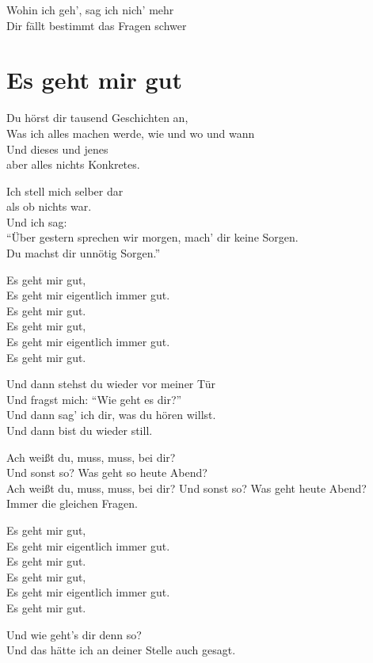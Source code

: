 \documentclass[]{book}
\begin{document}
Wohin ich geh', sag ich nich' mehr\\
Dir fällt bestimmt das Fragen schwer

\hypertarget{es-geht-mir-gut-2}{%
\section{Es geht mir gut}\label{es-geht-mir-gut-2}}

Du hörst dir tausend Geschichten an,\\
Was ich alles machen werde, wie und wo und wann\\
Und dieses und jenes\\
aber alles nichts Konkretes.

Ich stell mich selber dar\\
als ob nichts war.\\
Und ich sag:\\
``Über gestern sprechen wir morgen, mach' dir keine Sorgen.\\
Du machst dir unnötig Sorgen.''

Es geht mir gut,\\
Es geht mir eigentlich immer gut.\\
Es geht mir gut.\\
Es geht mir gut,\\
Es geht mir eigentlich immer gut.\\
Es geht mir gut.

Und dann stehst du wieder vor meiner Tür\\
Und fragst mich: ``Wie geht es dir?''\\
Und dann sag' ich dir, was du hören willst.\\
Und dann bist du wieder still.

Ach weißt du, muss, muss, bei dir?\\
Und sonst so? Was geht so heute Abend?\\
Ach weißt du, muss, muss, bei dir? Und sonst so? Was geht heute Abend?\\
Immer die gleichen Fragen.

Es geht mir gut,\\
Es geht mir eigentlich immer gut.\\
Es geht mir gut.\\
Es geht mir gut,\\
Es geht mir eigentlich immer gut.\\
Es geht mir gut.

Und wie geht's dir denn so?\\
Und das hätte ich an deiner Stelle auch gesagt.
\end{document}
